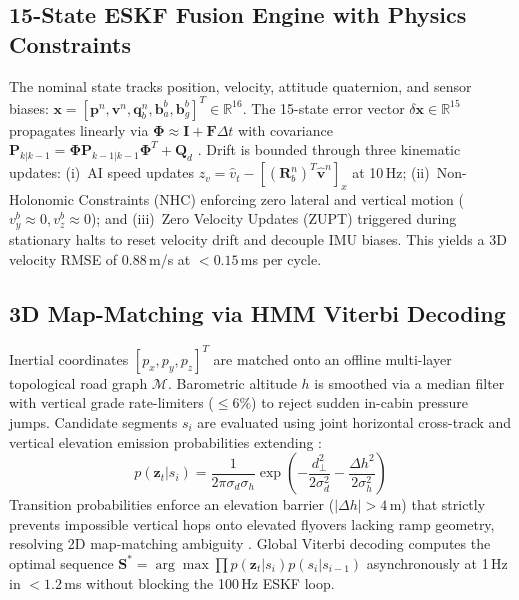 \documentclass[conference]{IEEEtran}
\begin{document}
\subsection{15-State ESKF Fusion Engine with Physics Constraints}
The nominal state tracks position, velocity, attitude quaternion, and sensor biases: $\mathbf{x} = [\mathbf{p}^n, \mathbf{v}^n, \mathbf{q}_b^n, \mathbf{b}_a^b, \mathbf{b}_g^b]^T \in \mathbb{R}^{16}$. The 15-state error vector $\delta\mathbf{x} \in \mathbb{R}^{15}$ propagates linearly via $\boldsymbol{\Phi} \approx \mathbf{I} + \mathbf{F}\Delta t$ with covariance $\mathbf{P}_{k|k-1} = \boldsymbol{\Phi}\mathbf{P}_{k-1|k-1}\boldsymbol{\Phi}^T + \mathbf{Q}_d$ \cite{sola2017}. Drift is bounded through three kinematic updates: (i)~AI speed updates $z_v = \hat{v}_t - [(\mathbf{R}_b^n)^T \hat{\mathbf{v}}^n]_x$ at 10\,Hz; (ii)~Non-Holonomic Constraints (NHC) \cite{dissanayake2001} enforcing zero lateral and vertical motion ($v_y^b \approx 0, v_z^b \approx 0$); and (iii)~Zero Velocity Updates (ZUPT) \cite{foxlin2005} triggered during stationary halts to reset velocity drift and decouple IMU biases. This yields a 3D velocity RMSE of 0.88\,m/s at $<0.15$\,ms per cycle.

\subsection{3D Map-Matching via HMM Viterbi Decoding}
Inertial coordinates $[p_x, p_y, p_z]^T$ are matched onto an offline multi-layer topological road graph $\mathcal{M}$. Barometric altitude $h$ is smoothed via a median filter with vertical grade rate-limiters ($\le 6\%$) to reject sudden in-cabin pressure jumps. Candidate segments $s_i$ are evaluated using joint horizontal cross-track and vertical elevation emission probabilities extending \cite{newson2009}:
\begin{equation}
p(\mathbf{z}_t|s_i) = \frac{1}{2\pi\sigma_d\sigma_h}\exp\left(-\frac{d_{\perp}^2}{2\sigma_d^2} - \frac{\Delta h^2}{2\sigma_h^2}\right)
\end{equation}
Transition probabilities enforce an elevation barrier ($|\Delta h| > 4$\,m) that strictly prevents impossible vertical hops onto elevated flyovers lacking ramp geometry, resolving 2D map-matching ambiguity \cite{sundar2026, javed2024}. Global Viterbi decoding computes the optimal sequence $\mathbf{S}^* = \arg\max \prod p(\mathbf{z}_t|s_i)p(s_i|s_{i-1})$ asynchronously at 1\,Hz in $<1.2$\,ms without blocking the 100\,Hz ESKF loop.
\end{document}
